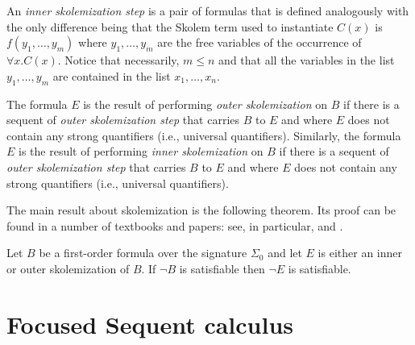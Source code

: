 \documentclass[a4paper,USenglish]{lipics-v2018}
\begin{document}
An \emph{inner skolemization step} is a pair of formulas that is
defined analogously with the only difference being that the
Skolem term used to instantiate $C(x)$ is $f(y_1,\ldots,y_m)$ where
$y_1,\ldots,y_m$ are the free variables of the occurrence of $\forall
x.C(x)$.  Notice that necessarily, $m\le n$ and that all the variables
in the list $y_1,\ldots, y_m$ are contained in the list $x_1,\ldots,
x_n$.

The formula $E$ is the result of performing \emph{outer
  skolemization} on $B$ if there is a sequent of \emph{outer
  skolemization step} that carries $B$ to $E$ and where $E$ does not
contain any strong quantifiers (i.e., universal quantifiers).
%
Similarly, the formula $E$ is the result of performing \emph{inner
  skolemization} on $B$ if there is a sequent of \emph{outer
  skolemization step} that carries $B$ to $E$ and where $E$ does not
contain any strong quantifiers (i.e., universal quantifiers).

The main result about skolemization is the following theorem.  Its
proof can be found in a number of textbooks and papers: see, in
particular, \cite{andrews81jacm} and \cite[Section
  4.5]{shoenfield67book}.

\begin{theorem}
Let $B$ be a first-order formula over the signature $\Sigma_0$ and
let $E$ is either an inner or outer skolemization of $B$.
%
If $\neg B$ is satisfiable then $\neg E$ is satisfiable.
\end{theorem}

\section{Focused Sequent calculus}
\label{sec:seq}
\end{document}
